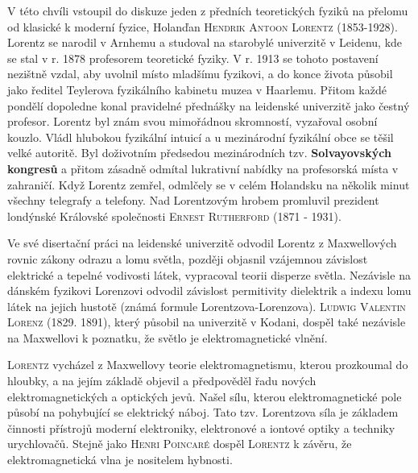       V této chvíli vstoupil do diskuze jeden z předních teoretických fyziků na přelomu od klasické
      k moderní fyzice, Holanďan \textsc{Hendrik Antoon Lorentz} (1853-1928). Lorentz se narodil v
      Arnhemu a studoval na starobylé univerzitě v Leidenu, kde se stal v r. 1878 profesorem
      teoretické fyziky. V r. 1913 se tohoto postavení nezištně vzdal, aby uvolnil místo mladšímu
      fyzikovi, a do konce života působil jako ředitel Teylerova fyzikálního kabinetu muzea v
      Haarlemu. Přitom každé pondělí dopoledne konal pravidelné přednášky na leidenské univerzitě
      jako čestný profesor. Lorentz byl znám svou mimořádnou skromností, vyzařoval osobní kouzlo.
      Vládl hlubokou fyzikální intuicí a u mezinárodní fyzikální obce se těšil velké autoritě. Byl
      doživotním předsedou mezinárodních tzv. \textbf{Solvayovských kongresů} a přitom zásadně
      odmítal lukrativní nabídky na profesorská místa v zahraničí. Když Lorentz zemřel, odmlčely se
      v celém Holandsku na několik minut všechny telegrafy a telefony. Nad Lorentzovým hrobem
      promluvil prezident londýnské Královské společnosti \textsc{Ernest Rutherford} (1871 - 1931).

      \begin{tcnote}
        Ve své disertační práci na leidenské univerzitě odvodil Lorentz z Maxwellových rovnic zákony
        odrazu a lomu světla, později objasnil vzájemnou závislost elektrické a tepelné vodivosti
        látek, vypracoval teorii disperze světla. Nezávisle na dánském fyzikovi Lorenzovi odvodil
        závislost permitivity dielektrik a indexu lomu látek na jejich hustotě (známá formule
        Lorentzova-Lorenzova). \textsc{Ludwig Valentin Lorenz} (1829. 1891), který působil na
        univerzitě v Kodani, dospěl také nezávisle na Maxwellovi k poznatku, že světlo je
        elektromagnetické vlnění.
      \end{tcnote}

      \textsc{Lorentz} vycházel z Maxwellovy teorie elektromagnetismu, kterou prozkoumal do hloubky,
      a na jejím základě objevil a předpověděl řadu nových elektromagnetických a optických jevů.
      Našel sílu, kterou elektromagnetické pole působí na pohybující se elektrický náboj. Tato tzv.
      Lorentzova síla je základem činnosti přístrojů moderní elektroniky, elektronové a iontové
      optiky a techniky urychlovačů. Stejně jako \textsc{Henri Poincaré} dospěl \textsc{Lorentz} k
      závěru, že elektromagnetická vlna je nositelem hybnosti.

